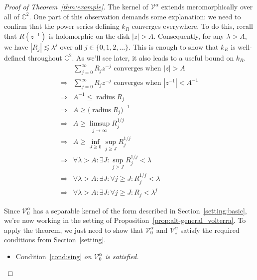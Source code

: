 \documentclass{article}
\theoremstyle{definition}
\theoremstyle{plain}
\newcommand{\C}{\mathbb{C}}
\newcommand{\volterra}{\mathcal{V}}
\newcommand{\hardpart}{\mathcal{V}_0}
\newcommand{\softpart}{\mathcal{V}_\star}
\newenvironment{verify}{\color{ForestGreen}}{\color{black}}
\begin{document}
\begin{proof}[Proof of Theorem~\ref{thm:example}]
The kernel of $\volterra^\alpha$ extends meromorphically over all of $\C^2$. One part of this observation demands some explanation: we need to confirm that the power series defining $k_R$ converges everywhere. To do this, recall that $R(z^{-1})$ is holomorphic on the disk $|z| > A$. Consequently, for any $\lambda > A$, we have $|R_{j}| \lesssim \lambda^j$ over all $j \in \{0, 1, 2, \ldots\}$. This is enough to show that $k_R$ is well-defined throughout $\C^2$. As we'll see later, it also leads to a useful bound on $k_R$.
\begin{verify}
\begin{align*}
& \sum_{j = 0}^\infty R_j z^{-j} \text{ converges when } |z| > A \\
\Longrightarrow & \sum_{j = 0}^\infty R_j z^{-j} \text{ converges when } |z^{-1}| < A^{-1} \\
\Longrightarrow & A^{-1} \le \operatorname{radius} R_j \\
\Longrightarrow & A \ge \big(\operatorname{radius} R_j\big)^{-1} \\
\Longrightarrow & A \ge \limsup_{j \to \infty} R_j^{1/j} \\
\Longrightarrow & A \ge \inf_{J \ge 0} \sup_{j \ge J} R_j^{1/j} \\
\Longrightarrow & \forall \lambda > A: \exists J: \sup_{j \ge J} R_j^{1/j} < \lambda \\
\Longrightarrow & \forall \lambda > A: \exists J: \forall j \ge J: R_j^{1/j} < \lambda \\
\Longrightarrow & \forall \lambda > A: \exists J: \forall j \ge J: R_j < \lambda^j
\end{align*}
\end{verify}

Since $\hardpart^\alpha$ has a separable kernel of the form described in Section~\ref{setting:basic}, we're now working in the setting of Proposition~\ref{prop:alt-general_volterra}. To apply the theorem, we just need to show that $\hardpart^\alpha$ and $\softpart^\alpha$ satisfy the required conditions from Section~\ref{setting}.
\begin{itemize}
\item Condition~\eqref{cond:sing} {\em on $\hardpart^\alpha$ is satisfied.}


\end{itemize}
\end{proof}
\end{document}
